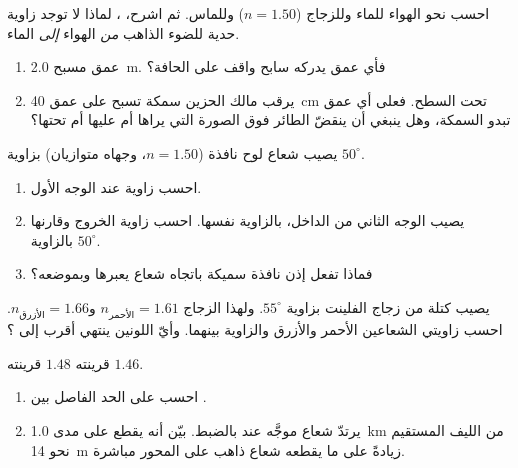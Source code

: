 \begin{exercise}[$\star\star$]\label{exo:g10:refraction:7}
احسب  نحو الهواء للماء وللزجاج ($n = 1.50$) وللماس.
ثم اشرح، ، لماذا لا توجد زاوية حدية
للضوء الذاهب \emph{من} الهواء \emph{إلى} الماء.
\end{exercise}

\begin{exercise}[$\star\star$]\label{exo:g10:refraction:8}
\begin{enumerate}
  \item عمق مسبح \qty{2.0}{m}. فأي عمق يدركه سابح واقف
        على الحافة؟
  \item يرقب مالك الحزين سمكة تسبح على عمق \qty{40}{cm} تحت السطح. فعلى
        أي عمق تبدو السمكة، وهل ينبغي أن ينقضّ الطائر
        فوق الصورة التي يراها أم عليها أم تحتها؟
\end{enumerate}
\end{exercise}

\begin{exercise}[$\star\star$]\label{exo:g10:refraction:9}
يصيب شعاع لوح نافذة ($n = 1.50$، وجهاه متوازيان) بزاوية $50^\circ$.
\begin{enumerate}
  \item احسب زاوية  عند الوجه الأول.
  \item يصيب  الوجه الثاني من الداخل، بالزاوية
        نفسها. احسب زاوية الخروج وقارنها بالزاوية $50^\circ$.
  \item فماذا تفعل إذن نافذة سميكة باتجاه شعاع يعبرها
        وبموضعه؟
\end{enumerate}
\end{exercise}

\begin{exercise}[$\star\star$]\label{exo:g10:refraction:10}
يصيب  كتلة من زجاج الفلينت بزاوية $55^\circ$. ولهذا
الزجاج $n_{\text{الأحمر}} = 1.61$ و$n_{\text{الأزرق}} = 1.66$. احسب
زاويتي  الشعاعين الأحمر والأزرق والزاوية بينهما.
وأيّ اللونين ينتهي أقرب إلى ؟
\end{exercise}

\begin{exercise}[$\star\star$]\label{exo:g10:refraction:11}
  قرينته $1.48$  قرينته
$1.46$.
\begin{enumerate}
  \item احسب  على الحد الفاصل بين  .
  \item يرتدّ شعاع موجَّه عند  بالضبط. بيّن
        أنه يقطع على مدى \qty{1.0}{km} من الليف المستقيم نحو
        \qty{14}{m} زيادةً على ما يقطعه شعاع ذاهب على المحور مباشرة.
\end{enumerate}
\end{exercise}

